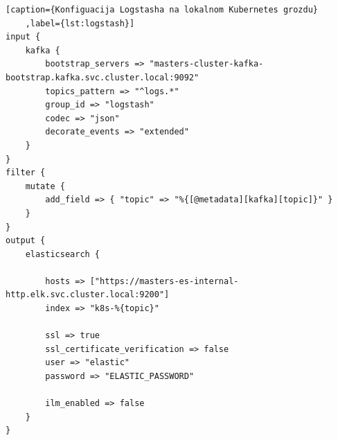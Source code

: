 \documentclass[times, utf8, diplomski]{fer}
\begin{document}
\clearpage
\begin{lstlisting}[caption={Konfiguacija Logstasha na lokalnom Kubernetes grozdu}
	,label={lst:logstash}]
input {
	kafka {
		bootstrap_servers => "masters-cluster-kafka-bootstrap.kafka.svc.cluster.local:9092"
		topics_pattern => "^logs.*"
		group_id => "logstash"
		codec => "json"
		decorate_events => "extended"
	}
}
filter {
	mutate {
		add_field => { "topic" => "%{[@metadata][kafka][topic]}" }
	}
}
output {
	elasticsearch {
		
		hosts => ["https://masters-es-internal-http.elk.svc.cluster.local:9200"]
		index => "k8s-%{topic}"
		
		ssl => true
		ssl_certificate_verification => false
		user => "elastic"
		password => "ELASTIC_PASSWORD"
		
		ilm_enabled => false
	}
}
\end{lstlisting}
\end{document}
